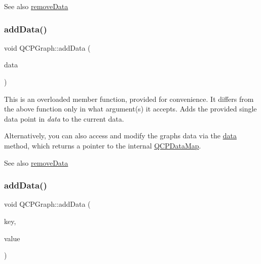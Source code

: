 \begin{DoxySeeAlso}{See also}
\hyperlink{class_q_c_p_graph_a4a0fde50b7db9db0a85b5c5b6b10098f}{remove\+Data} 
\end{DoxySeeAlso}
\hypertarget{class_q_c_p_graph_a80cc91e1e0ef77eb50afc5b366d0efd9}{}\label{class_q_c_p_graph_a80cc91e1e0ef77eb50afc5b366d0efd9} 
\subsubsection{\texorpdfstring{add\+Data()}{addData()}\hspace{0.1cm}{\footnotesize\ttfamily [2/4]}}
{\footnotesize\ttfamily void Q\+C\+P\+Graph\+::add\+Data (\begin{DoxyParamCaption}\item[{const \hyperlink{class_q_c_p_data}{Q\+C\+P\+Data} \&}]{data }\end{DoxyParamCaption})}

This is an overloaded member function, provided for convenience. It differs from the above function only in what argument(s) it accepts. Adds the provided single data point in {\itshape data} to the current data.

Alternatively, you can also access and modify the graph\textquotesingle{}s data via the \hyperlink{class_q_c_p_graph_acde1c0d1f6a817930489548396e6b3e6}{data} method, which returns a pointer to the internal \hyperlink{qcustomplot_8h_a84a9c4a4c2216ccfdcb5f3067cda76e3}{Q\+C\+P\+Data\+Map}.

\begin{DoxySeeAlso}{See also}
\hyperlink{class_q_c_p_graph_a4a0fde50b7db9db0a85b5c5b6b10098f}{remove\+Data} 
\end{DoxySeeAlso}
\hypertarget{class_q_c_p_graph_a0bf98b1972286cfb7b1c4b7dd6ae2012}{}\label{class_q_c_p_graph_a0bf98b1972286cfb7b1c4b7dd6ae2012} 
\subsubsection{\texorpdfstring{add\+Data()}{addData()}\hspace{0.1cm}{\footnotesize\ttfamily [3/4]}}
{\footnotesize\ttfamily void Q\+C\+P\+Graph\+::add\+Data (\begin{DoxyParamCaption}\item[{double}]{key,  }\item[{double}]{value }\end{DoxyParamCaption})}

